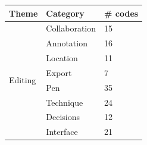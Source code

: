 \begin{table}[p]
  \centering
  {\small
    \begin{tabular}{l l l} %
      \hline
      \textbf{Theme} & \textbf{Category} & \textbf{\# codes} \\ \hline
      \multirow{8}{*}{Editing}
      & Collaboration & 15 \\ %
      & Annotation & 16 \\ %
      & Location & 11 \\ %
      & Export & 7 \\ %
      & Pen & 35 \\ %
      & Technique & 24 \\ %
      & Decisions & 12 \\ %
      & Interface & 21 \\ \hline %

\end{tabular}}
\end{table}
